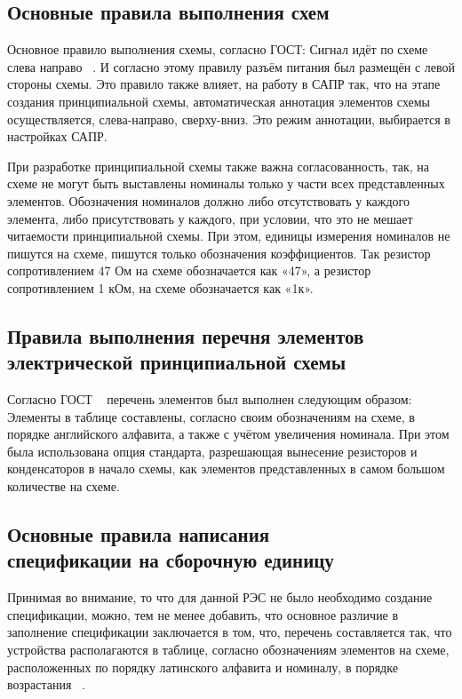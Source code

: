 \subsection{Основные правила выполнения схем}

Основное правило выполнения схемы, согласно ГОСТ:
Сигнал идёт по схеме слева направо ~\cite{GOST-2-702-2011}.
И согласно этому правилу разъём питания был размещён с левой стороны схемы.
Это правило также влияет,
на работу в САПР так,
что на этапе создания принципиальной схемы,
автоматическая аннотация элементов схемы осуществляется,
слева-направо, сверху-вниз.
Это режим аннотации,
выбирается в настройках САПР.

При разработке принципиальной схемы также важна согласованность,
так, на схеме не могут быть выставлены номиналы только у части
всех представленных элементов.
Обозначения номиналов должно либо отсутствовать у каждого элемента,
либо присутствовать у каждого, при условии,
что это не мешает читаемости принципиальной схемы.
При этом,
единицы измерения номиналов не пишутся на схеме,
пишутся только обозначения коэффициентов.
Так резистор сопротивлением 47 Ом на схеме обозначается как «47», а
резистор сопротивлением 1 кОм, на схеме обозначается как «1к».

\subsection{Правила выполнения
  перечня элементов\\
  электрической принципиальной схемы}

Согласно ГОСТ ~\cite{GOST-2-702-2011} перечень
элементов был выполнен следующим образом:
Элементы в таблице составлены,
согласно своим обозначениям на схеме, в порядке английского алфавита,
а также с учётом увеличения номинала.
При этом была использована опция стандарта,
разрешающая вынесение резисторов и конденсаторов
в начало схемы, как элементов представленных
в самом большом количестве на схеме.

\subsection{Основные правила написания\\
  спецификации на сборочную единицу}

Принимая во внимание,
то что для данной РЭС не было необходимо создание спецификации,
можно, тем не менее добавить,
что основное различие в заполнение спецификации заключается в том,
что, перечень составляется так, что устройства располагаются в таблице,
согласно обозначениям элементов на схеме, расположенных по порядку латинского алфавита и номиналу,
в порядке возрастания ~\cite{GOST-spec}.

